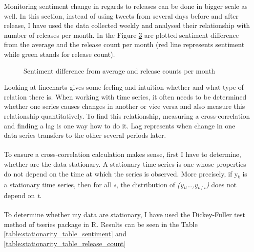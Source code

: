 Monitoring sentiment change in regards to releases can be done in bigger scale as well. In this section, instead of using tweets from several days before and after release, I have used the data collected weekly and analysed their relationship with number of releases per month. In the Figure \ref{fig:ReleasesSentiment3} are plotted sentiment difference from the average and the release count per month (red line represents sentiment while green stands for release count).

\begin{figure}[H]%
    \centering
    \qquad
    \label{fig:ReleasesSentiment1}%
\end{figure}


\begin{figure}[H]%
    \centering
    \qquad
    \label{fig:ReleasesSentiment2}%
\end{figure}


\begin{figure}[H]%
    \centering
    \qquad
        \caption{Sentiment difference from average and release counts per month}
    \label{fig:ReleasesSentiment3}%
\end{figure}

Looking at linecharts gives some feeling and intuition whether and what type of relation there is. When working with time series, it often needs to be determined whether one series causes changes in another or vice versa and also measure this relationship quantitatively. To find this relationship, measuring a cross-correlation and finding a lag is one way how to do it. Lag represents when change in one data series transfers to the other several periods later. \\
\\
To ensure a cross-correlation calculation makes sense, first I have to determine, whether are the data stationary. A stationary time series is one whose properties do not depend on the time at which the series is observed\cite{hyndman5forecast}. More precisely, if y\textsubscript{t} is a stationary time series, then for all \textit{s}, the distribution of \textit{(y\textsubscript{t},…,y\textsubscript{t+s})} does not depend on \textit{t}.\\
\\
To determine whether my data are stationary, I have used the Dickey-Fuller test method of tseries package in R. Results can be seen in the Table \ref{table:stationarity_table_sentiment} and \ref{table:stationarity_table_release_count} 

